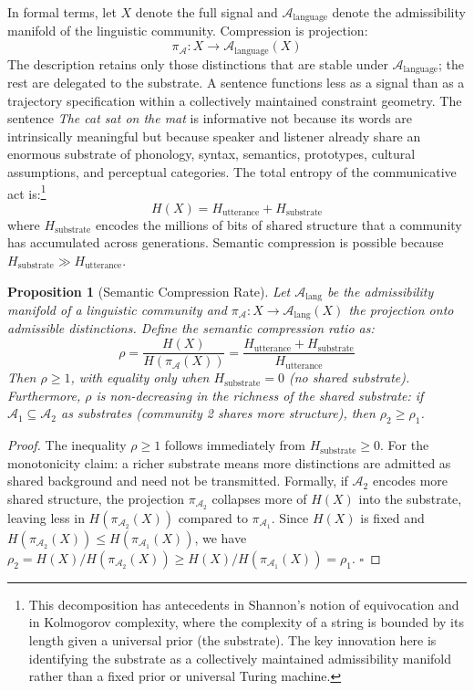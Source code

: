 \documentclass[12pt,a4paper]{article}
\newtheorem{proposition}[theorem]{Proposition}
\begin{document}
In formal terms, let $X$ denote the full signal and $\mathcal{A}_{\text{language}}$ denote the admissibility manifold of the linguistic community. Compression is projection:
\[
\pi_{\mathcal{A}} : X \to \mathcal{A}_{\text{language}}(X)
\]
The description retains only those distinctions that are stable under $\mathcal{A}_{\text{language}}$; the rest are delegated to the substrate. A sentence functions less as a signal than as a trajectory specification within a collectively maintained constraint geometry. The sentence \emph{The cat sat on the mat} is informative not because its words are intrinsically meaningful but because speaker and listener already share an enormous substrate of phonology, syntax, semantics, prototypes, cultural assumptions, and perceptual categories. The total entropy of the communicative act is:\footnote{This decomposition has antecedents in Shannon's notion of equivocation and in Kolmogorov complexity, where the complexity of a string is bounded by its length given a universal prior (the substrate). The key innovation here is identifying the substrate as a collectively maintained admissibility manifold rather than a fixed prior or universal Turing machine.}
\[
H(X) = H_{\text{utterance}} + H_{\text{substrate}}
\]
where $H_{\text{substrate}}$ encodes the millions of bits of shared structure that a community has accumulated across generations. Semantic compression is possible because $H_{\text{substrate}} \gg H_{\text{utterance}}$.

\begin{proposition}[Semantic Compression Rate]
\label{prop:compression}
Let $\mathcal{A}_{\text{lang}}$ be the admissibility manifold of a linguistic community and $\pi_\mathcal{A}: X \to \mathcal{A}_{\text{lang}}(X)$ the projection onto admissible distinctions. Define the \emph{semantic compression ratio} as:
\[
\rho = \frac{H(X)}{H(\pi_\mathcal{A}(X))} = \frac{H_{\text{utterance}} + H_{\text{substrate}}}{H_{\text{utterance}}}
\]
Then $\rho \geq 1$, with equality only when $H_{\text{substrate}} = 0$ (no shared substrate). Furthermore, $\rho$ is non-decreasing in the richness of the shared substrate: if $\mathcal{A}_1 \subseteq \mathcal{A}_2$ as substrates (community 2 shares more structure), then $\rho_2 \geq \rho_1$.
\end{proposition}

\begin{proof}
The inequality $\rho \geq 1$ follows immediately from $H_{\text{substrate}} \geq 0$. For the monotonicity claim: a richer substrate means more distinctions are admitted as shared background and need not be transmitted. Formally, if $\mathcal{A}_2$ encodes more shared structure, the projection $\pi_{\mathcal{A}_2}$ collapses more of $H(X)$ into the substrate, leaving less in $H(\pi_{\mathcal{A}_2}(X))$ compared to $\pi_{\mathcal{A}_1}$. Since $H(X)$ is fixed and $H(\pi_{\mathcal{A}_2}(X)) \leq H(\pi_{\mathcal{A}_1}(X))$, we have $\rho_2 = H(X)/H(\pi_{\mathcal{A}_2}(X)) \geq H(X)/H(\pi_{\mathcal{A}_1}(X)) = \rho_1$. $\square$
\end{proof}
\end{document}
